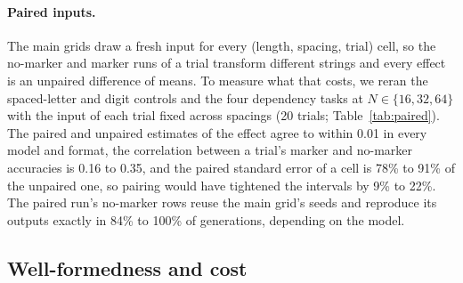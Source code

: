 \documentclass[10pt]{article} %
\begin{document}
\paragraph{Paired inputs.} The main grids draw a fresh input for every (length, spacing, trial) cell, so the no-marker and marker runs of a trial transform different strings and every effect is an unpaired difference of means. To measure what that costs, we reran the spaced-letter and digit controls and the four dependency tasks at $N \in \{16, 32, 64\}$ with the input of each trial fixed across spacings (20 trials; Table~\ref{tab:paired}). The paired and unpaired estimates of the effect agree to within 0.01 in every model and format, the correlation between a trial's marker and no-marker accuracies is 0.16 to 0.35, and the paired standard error of a cell is 78\% to 91\% of the unpaired one, so pairing would have tightened the intervals by 9\% to 22\%. The paired run's no-marker rows reuse the main grid's seeds and reproduce its outputs exactly in 84\% to 100\% of generations, depending on the model.

\begin{table}[!htbp]
\centering
\small
\caption{Paired-input rerun. Per model and format, averaged over cells (task, alphabet or modulus, $N$, $k > 0$): the marker effect from the main grid (different inputs per condition) and from the paired run (same inputs), the mean standard error of a cell under the unpaired and the paired estimator, and the mean correlation $r$ between a trial's marker and no-marker accuracies.}
\label{tab:paired}

\end{table}

\subsection{Well-formedness and cost}
\label{app:wfr}
\end{document}
